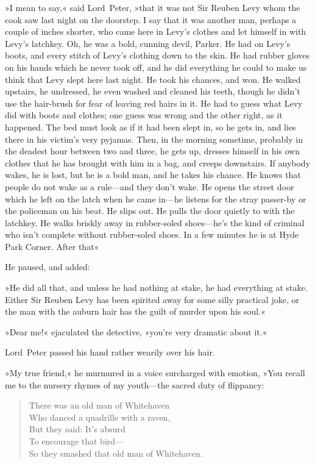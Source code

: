 »I mean to say,« said Lord~Peter, »that it was not Sir Reuben Levy whom the cook saw last night on the doorstep. I say that it was another man, perhaps a couple of inches shorter, who came here in Levy's clothes and let himself in with Levy's latchkey. Oh, he was a bold, cunning devil, Parker. He had on Levy's boots, and every stitch of Levy's clothing down to the skin. He had rubber gloves on his hands which he never took off, and he did everything he could to make us think that Levy slept here last night. He took his chances, and won. He walked upstairs, he undressed, he even washed and cleaned his teeth, though he didn't use the hair-brush for fear of leaving red hairs in it. He had to guess what Levy did with boots and clothes; one guess was wrong and the other right, as it happened. The bed must look as if it had been slept in, so he gets in, and lies there in his victim's very pyjamas. Then, in the morning sometime, probably in the deadest hour between two and three, he gets up, dresses himself in his own clothes that he has brought with him in a bag, and creeps downstairs. If anybody wakes, he is lost, but he is a bold man, and he takes his chance. He knows that people do not wake as a rule—and they don't wake. He opens the street door which he left on the latch when he came in—he listens for the stray passer-by or the policeman on his beat. He slips out. He pulls the door quietly to with the latchkey. He walks briskly away in rubber-soled shoes—he's the kind of criminal who isn't complete without rubber-soled shoes. In a few minutes he is at Hyde Park Corner. After that\longdash«

He paused, and added:

»He did all that, and unless he had nothing at stake, he had everything at stake. Either Sir Reuben Levy has been spirited away for some silly practical joke, or the man with the auburn hair has the guilt of murder upon his soul.«

»Dear me!« ejaculated the detective, »you're very dramatic about it.«

Lord~Peter passed his hand rather wearily over his hair.

»My true friend,« he murmured in a voice surcharged with emotion, »You recall me to the nursery rhymes of my youth—the sacred duty of flippancy:

\makeatletter
{}
{%
}{%
\enlargethispage{\baselineskip}
}
\makeatother

\begin{samepage}
\begin{verse}
There was an old man of Whitehaven\\
Who danced a quadrille with a raven,\\
\vin But they said: It's absurd\\
\vin To encourage that bird---\\
So they smashed that old man of Whitehaven.\\
\end{verse}
\end{samepage}

